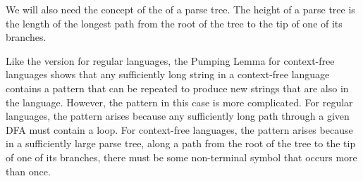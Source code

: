 We will also need the concept of the  of a parse tree.  The height of a parse tree is
the length of the longest path from the root of the tree to the
tip of one of its branches.

Like the version for regular languages, the Pumping Lemma for
context-free languages shows that any sufficiently long string
in a context-free language contains a pattern that can be repeated
to produce new strings that are also in the language.  However,
the pattern in this case is more complicated.  For regular
languages, the pattern arises because any sufficiently long path
through a given DFA must contain a loop.   For context-free
languages, the pattern arises because in a sufficiently
large parse tree, along a path from the root of the tree to the
tip of one of its branches, there must be some non-terminal
symbol that occurs more than once.


